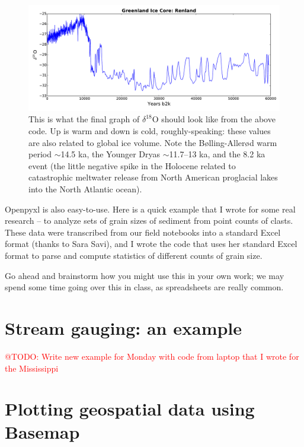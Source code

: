 \documentclass[a4paper,10pt]{scrartcl}
\makeatletter
\newcommand{\todo}[1]{\textcolor{red}{@TODO: #1}}
\makeatother
\begin{document}
\begin{figure}[!ht]
\begin{center}
\includegraphics[width=.9\linewidth]{figures/FilesData/GreenlandRenlandXLS.pdf}
\end{center}
\caption{This is what the final graph of $\delta^{18}$O should look like from the above code. Up is warm and down is cold, roughly-speaking: these values are also related to global ice volume. Note the Bølling-Allerød warm period $\sim$14.5 ka, the Younger Dryas $\sim$11.7--13 ka, and the 8.2 ka event (the little negative spike in the Holocene related to catastrophic meltwater release from North American proglacial lakes into the North Atlantic ocean).}
\end{figure}

Openpyxl is also easy-to-use. Here is a quick example that I wrote for some real research -- to analyze sets of grain sizes of sediment from point counts of clasts. These data were transcribed from our field notebooks into a standard Excel format (thanks to Sara Savi), and I wrote the code that uses her standard Excel format to parse and compute statistics of different counts of grain size.

Go ahead and brainstorm how you might use this in your own work; we may spend some time going over this in class, as spreadsheets are really common.



\section{Stream gauging: an example}

\todo{Write new example for Monday with code from laptop that I wrote for the Mississippi}

\section{Plotting geospatial data using Basemap}
\end{document}
